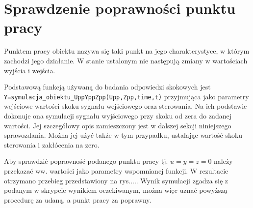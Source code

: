 \chapter{Sprawdzenie poprawności punktu pracy}
Punktem pracy obiektu nazywa się taki punkt na jego charakterystyce, w którym zachodzi jego działanie. W stanie ustalonym nie następują zmiany w wartościach wyjścia i wejścia.

Podstawową funkcją używaną do badania odpowiedzi skokowych jest \verb+Y=symulacja_obiektu_UppYppZpp(Upp,Zpp,time,t)+ przyjmująca jako parametry wejściowe wartości skoku sygnału wejściowego oraz sterowania. Na ich podstawie dokonuje ona symulacji sygnału wyjściowego przy skoku od zera do zadanej wartości. Jej szczegółowy opis zamieszczony jest w dalszej sekcji niniejszego sprawozdania. Można jej użyć także w tym przypadku, ustalając wartość skoku sterowania i zakłócenia na zero.

Aby sprawdzić poprawność podanego punktu pracy tj. $u=y=z=0$ należy przekazać ww. wartości jako parametry wspomnianej funkcji. W rezultacie otrzymano przebieg przedstawiony na rys..... Wynik symulacji zgadza się z podanym w skrypcie wynikiem oczekiwanym, można więc uznać powyższą procedurę za udaną, a punkt pracy za poprawny.